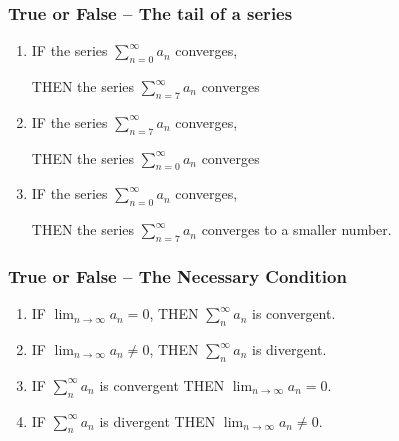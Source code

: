 \begin{frame}[t]
	\fontsize{12}{12}\selectfont
	\frametitle{True or False -- The tail of a series}

	\begin{enumerate}
		\item IF the series {\color{blue} $\displaystyle \sum_{n=0}^{\infty}a_{n}$} converges,

			THEN the series {\color{red} $\displaystyle \sum_{n=7}^{\infty}a_{n}$} converges
			\vspace{.2cm}

		\item IF the series {\color{red} $\displaystyle \sum_{n=7}^{\infty}a_{n}$} converges,

			THEN the series {\color{blue} $\displaystyle \sum_{n=0}^{\infty}a_{n}$} converges
			\vspace{.2cm}

		\item IF the series {\color{red} $\displaystyle \sum_{n=0}^{\infty}a_{n}$} converges,

			THEN the series {\color{blue} $\displaystyle \sum_{n=7}^{\infty}a_{n}$} converges
			to a smaller number.
	\end{enumerate}
\end{frame}

\begin{frame}[t]
	\frametitle{True or False -- The Necessary Condition}

	\begin{enumerate}
		\item IF $\displaystyle \lim_{n \to \infty}a_{n}= 0$, \quad THEN
			$\displaystyle \sum_{n}^{\infty}a_{n}$ is convergent.
			\vfill

		\item IF $\displaystyle \lim_{n \to \infty}a_{n}\neq 0$, \quad THEN
			$\displaystyle \sum_{n}^{\infty}a_{n}$ is divergent.
			\vfill

		\item IF $\displaystyle \sum_{n}^{\infty}a_{n}$ is convergent \quad THEN $\displaystyle
			\lim_{n \to \infty}a_{n}= 0$.
			\vfill

		\item IF $\displaystyle \sum_{n}^{\infty}a_{n}$ is divergent \quad THEN $\displaystyle
			\lim_{n \to \infty}a_{n}\neq 0$.
			\vfill
	\end{enumerate}
\end{frame}

